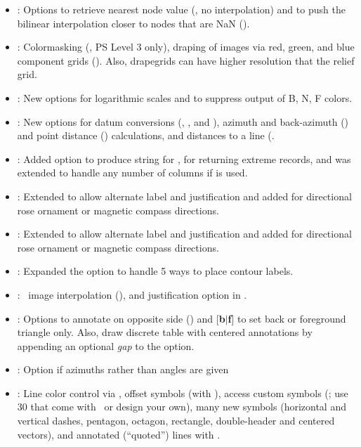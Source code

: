 \begin{description}
\begin{itemize}
\item {}:	Options to retrieve nearest node value (, no interpolation) and to push
the bilinear interpolation closer to nodes that are NaN ().
\item {}:	Colormasking (, PS Level 3 only), draping of images via red, green,
and blue component grids ().  Also,  drapegrids can have higher resolution that the relief grid.
\item {}:	New options  for logarithmic scales and  to suppress output
of B, N, F colors.
\item {}:	New options for datum conversions (, , and ), azimuth and
back-azimuth () and point distance () calculations, and distances to a line (.
\item {}:		Added  option to produce  string for ,
 for returning extreme records, and  was extended to handle any number of columns if  is used.
\item {}:	Extended  to allow alternate label and justification and added 
for directional rose ornament or magnetic compass directions.
\item {}:	Extended  to allow alternate label and justification and added 
for directional rose ornament or magnetic compass directions.
\item {}:	Expanded the  option to handle 5 ways to place contour labels. 
\item {}:	\PS\ image interpolation (), and justification option
in .
\item {}:	Options to annotate on opposite side () and [{\bf b$|$f}] to set
back or foreground triangle only.  Also, draw discrete table with centered annotations by appending an optional
{\it gap} to the  option. 
\item {}: 	Option  if azimuths rather than angles are given
\item {}: 	Line color control via , offset symbols (with ), access custom symbols
(; use 30 that come with \GMT\ or design your own), many new symbols (horizontal and vertical dashes,
pentagon, octagon, rectangle, double-header and centered vectors), and annotated (``quoted'') lines with .

\end{itemize}
\end{description}
